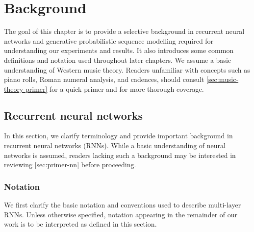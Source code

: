 \chapter{Background}

\ifpdf
    \graphicspath{{Chapter2/Figs/Raster/}{Chapter2/Figs/PDF/}{Chapter2/Figs/}}
\else
    \graphicspath{{Chapter2/Figs/Vector/}{Chapter2/Figs/}}
\fi

The goal of this chapter is to provide a selective background in recurrent neural
networks and generative probabilistic sequence modelling required for understanding
our experiments and results. It also introduces some common definitions and
notation used throughout later chapters. We assume a basic understanding of
Western music theory. Readers unfamiliar with concepts such as piano rolls,
Roman numeral analysis, and cadences, should consult
\vref{sec:music-theory-primer} for a quick primer and
\citet{piston1978harmony,denny1960oxford} for more thorough coverage.

\section{Recurrent neural networks}\label{sec:bg-rnn}


In this section, we clarify terminology and provide important background in
recurrent neural networks (RNNs). While a basic understanding of neural
networks is assumed, readers lacking such a background may be interested in
reviewing \vref{sec:primer-nn} before proceeding.

\subsection{Notation}


We first clarify the basic notation and conventions used to describe multi-layer
RNNs. Unless otherwise specified, notation appearing in the
remainder of our work is to be interpreted as defined in this section.

